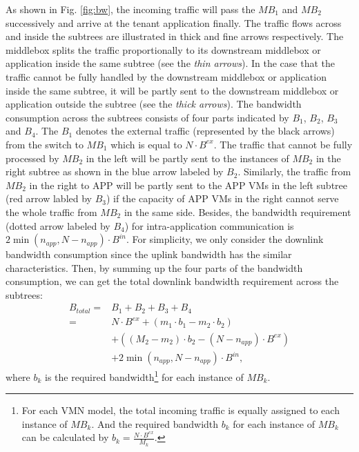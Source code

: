 \documentclass[review]{elsarticle}
\begin{document}
As shown in Fig. \ref{fig:bw}, the incoming traffic will pass the $MB_1$ and $MB_2$ successively and  arrive at the tenant application finally. The traffic flows across and inside the subtrees are illustrated in thick and fine arrows respectively. %
The middlebox splits the traffic proportionally to its downstream middlebox or application inside the same subtree (see the \emph{thin arrows}). 
In the case that the traffic cannot be fully handled by the downstream middlebox or application inside the same subtree, it will be partly sent to the downstream middlebox or application outside the subtree (see the \emph{thick arrows}). 
The bandwidth consumption across the subtrees consists of four parts indicated by $B_1$, $B_2$, $B_3$ and $B_4$. The $B_1$ denotes the external traffic (represented by the black arrows) from the switch to $MB_1$ which is equal to $N\cdot B^{ex}$. The traffic that cannot be fully processed by $MB_2$ in the left will be partly sent to the instances of $MB_2$ in the right subtree as shown in the blue arrow labeled by $B_2$. Similarly, the traffic from $MB_2$ in the right to APP will be partly sent to the APP VMs in the left subtree (red arrow labled by $B_3$) if the capacity of APP VMs in the right cannot serve the whole traffic from $MB_2$ in the same side. Besides, the bandwidth requirement (dotted arrow labeled by $B_4$) for intra-application communication is $2\min(n_{app}  ,N-n_{app})\cdot B^{in}$. For simplicity, we only consider the downlink bandwidth consumption since the uplink bandwidth has the similar characteristics. %
Then, by summing up the four parts of the bandwidth consumption, we can get the total downlink bandwidth requirement across the subtrees:
\begin{equation}
\begin{aligned}
B_{total} = &B_1+B_2+B_3+B_4 \\
=&N \cdot B^{ex}+(m_1 \cdot b_1-m_2\cdot b_2)\\
&+((M_2-m_2)\cdot b_2-(N-n_{app})\cdot B^{ex})\\
&+2\min(n_{app}, N-n_{app})\cdot B^{in},
\end{aligned}
\end{equation}
where $b_k$ is the required bandwidth\footnote{For each VMN model, %
	the total incoming traffic is equally assigned to each instance of $MB_k$. And the required bandwidth $b_k$ for each instance of $MB_k$ can be calculated by 
	$b_{k}=\frac{N\cdot B^{ex}}{M_{k}}$.
	}  for each instance of $MB_k$.
	
\end{document}
